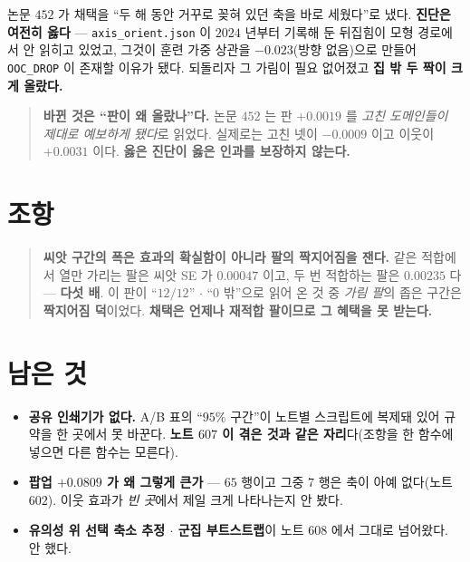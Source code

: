 \documentclass[11pt]{article}
\begin{document}
논문 $452$ 가 채택을 ``두 해 동안 거꾸로 꽂혀 있던 축을 바로 세웠다''로
냈다. \textbf{진단은 여전히 옳다} --- \texttt{axis\_orient.json} 이
$2024$ 년부터 기록해 둔 뒤집힘이 모형 경로에서 안 읽히고 있었고, 그것이
훈련 가중 상관을 $-0.023$(방향 없음)으로 만들어 \texttt{OOC\_DROP} 이
존재할 이유가 됐다. 되돌리자 그 가림이 필요 없어졌고 \textbf{집 밖 두 짝이
크게 올랐다.}

\begin{quote}
\textbf{바뀐 것은 ``판이 왜 올랐나''다.} 논문 $452$ 는 판 $+0.0019$ 를
\emph{고친 도메인들이 제대로 예보하게 됐다}로 읽었다. 실제로는 고친 넷이
$-0.0009$ 이고 이웃이 $+0.0031$ 이다. \textbf{옳은 진단이 옳은 인과를
보장하지 않는다.}
\end{quote}

\section*{조항}

\begin{quote}
\textbf{씨앗 구간의 폭은 효과의 확실함이 아니라 팔의 짝지어짐을 잰다.}
같은 적합에서 열만 가리는 팔은 씨앗 SE 가 $0.00047$ 이고, 두 번 적합하는
팔은 $0.00235$ 다 --- \textbf{다섯 배}. 이 판이 ``$12/12$'' $\cdot$
``$0$ 밖''으로 읽어 온 것 중 \emph{가림 팔}의 좁은 구간은 \textbf{짝지어짐
덕}이었다. \textbf{채택은 언제나 재적합 팔이므로 그 혜택을 못 받는다.}
\end{quote}

\section*{남은 것}

\begin{itemize}
\item \textbf{공유 인쇄기가 없다.} A/B 표의 ``$95\%$ 구간''이 노트별
스크립트에 복제돼 있어 규약을 한 곳에서 못 바꾼다. \textbf{노트 $607$ 이
겪은 것과 같은 자리}다(조항을 한 함수에 넣으면 다른 함수는 모른다).
\item \textbf{팝업 $+0.0809$ 가 왜 그렇게 큰가} --- $65$ 행이고 그중
$7$ 행은 축이 아예 없다(노트 $602$). 이웃 효과가 \emph{빈 곳}에서 제일
크게 나타나는지 안 봤다.
\item \textbf{유의성 위 선택 축소 추정 $\cdot$ 군집 부트스트랩}이
노트 $608$ 에서 그대로 넘어왔다. 안 했다.
\end{itemize}
\end{document}
